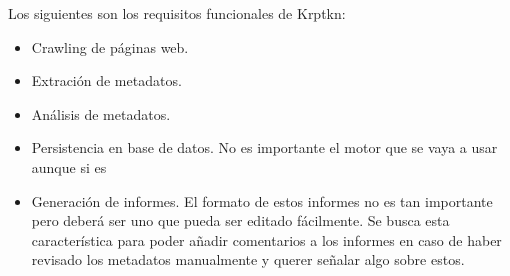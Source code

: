 Los siguientes son los requisitos funcionales de Krptkn:

\begin{itemize}
    \item Crawling de páginas web. 
    \item Extración de metadatos. 
    \item Análisis de metadatos. 
    \item Persistencia en base de datos. No es importante el motor que se vaya a usar aunque si es
    \item Generación de informes. El formato de estos informes no es tan importante pero deberá ser uno que pueda ser editado fácilmente. Se busca esta característica para poder añadir comentarios a los informes en caso de haber revisado los metadatos manualmente y querer señalar algo sobre estos.
\end{itemize}